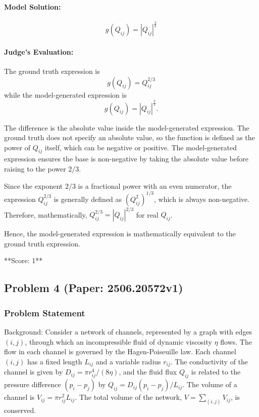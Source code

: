 \documentclass[10pt]{article}
\begin{document}
\paragraph*{Model Solution:}
\[ g(Q_{ij})=|Q_{ij}|^{\tfrac23} \]

\paragraph*{Judge's Evaluation:}

The ground truth expression is 
\[
g(Q_{ij}) = Q_{ij}^{2/3}
\]
while the model-generated expression is 
\[
g(Q_{ij}) = |Q_{ij}|^{\frac{2}{3}}.
\]

The difference is the absolute value inside the model-generated expression. The ground truth does not specify an absolute value, so the function is defined as the power of \(Q_{ij}\) itself, which can be negative or positive. The model-generated expression ensures the base is non-negative by taking the absolute value before raising to the power \(2/3\).

Since the exponent \(2/3\) is a fractional power with an even numerator, the expression \(Q_{ij}^{2/3}\) is generally defined as \(\left(Q_{ij}^2\right)^{1/3}\), which is always non-negative. Therefore, mathematically, \(Q_{ij}^{2/3} = |Q_{ij}|^{2/3}\) for real \(Q_{ij}\).

Hence, the model-generated expression is mathematically equivalent to the ground truth expression.

**Score: 1**

\newpage
\subsection*{Problem 4 (Paper: 2506.20572v1)}
\subsubsection*{Problem Statement}
Background:
Consider a network of channels, represented by a graph with edges $(i,j)$, through which an incompressible fluid of dynamic viscosity $\eta$ flows. The flow in each channel is governed by the Hagen-Poiseuille law. Each channel $(i,j)$ has a fixed length $L_{ij}$ and a variable radius $r_{ij}$. The conductivity of the channel is given by $D_{ij} = \pi r_{ij}^4 / (8\eta)$, and the fluid flux $Q_{ij}$ is related to the pressure difference $(p_i - p_j)$ by $Q_{ij} = D_{ij}(p_i - p_j)/L_{ij}$. The volume of a channel is $V_{ij} = \pi r_{ij}^2 L_{ij}$. The total volume of the network, $V = \sum_{(i,j)} V_{ij}$, is conserved.
\end{document}
